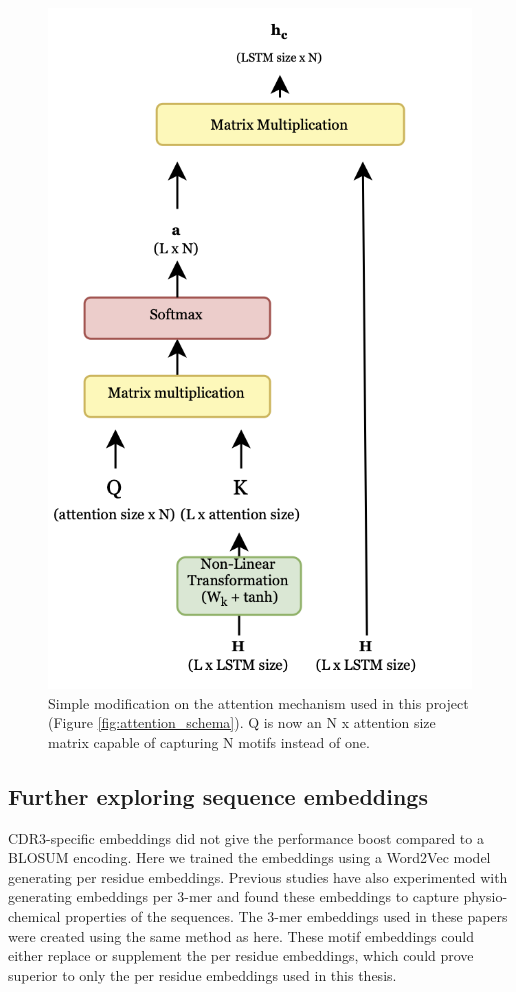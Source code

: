 \begin{figure}
    \centering
    \includegraphics[scale=0.38]{figures/attention_diagram_discuss.png}
    \caption{Simple modification on the attention mechanism used in this project (Figure \ref{fig:attention_schema}). Q is now an N x attention size matrix capable of capturing N motifs instead of one.}
    \label{fig:att_diag_discuss}
\end{figure}

\subsection{Further exploring sequence embeddings}
CDR3-specific embeddings did not give the performance boost compared to a BLOSUM encoding. Here we trained the embeddings using a Word2Vec model generating per residue embeddings. Previous studies have also experimented with generating embeddings per 3-mer \cite{Asgari2015ContinuousGenomics, Yang2018LearnedLearning} and found these embeddings to capture physio-chemical properties of the sequences. The 3-mer embeddings used in these papers were created using the same method as here. These motif embeddings could either replace or supplement the per residue embeddings, which could prove superior to only the per residue embeddings used in this thesis.

